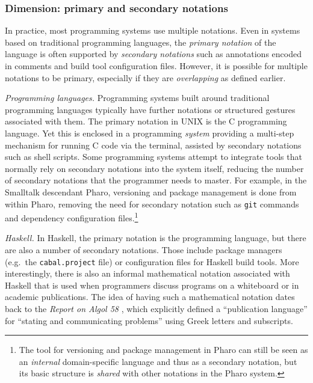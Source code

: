 \documentclass[english,submission]{programming}
\begin{document}
\hypertarget{dimension-primary-and-secondary-notations}{%
\subsubsection{Dimension: primary and secondary
notations}\label{dimension-primary-and-secondary-notations}}

In practice, most programming systems use multiple notations. Even in
systems based on traditional programming languages, the \emph{primary
notation} of the language is often supported by \emph{secondary
notations} such as annotations encoded in comments and build tool
configuration files. However, it is possible for multiple notations to
be primary, especially if they are \emph{overlapping} as defined
earlier.

\emph{Programming languages.} Programming systems built around
traditional programming languages typically have further notations or
structured gestures associated with them. The primary notation in UNIX
is the C programming language. Yet this is enclosed in a programming
\emph{system} providing a multi-step mechanism for running C code via
the terminal, assisted by secondary notations such as shell scripts.
Some programming systems attempt to integrate tools that normally rely
on secondary notations into the system itself, reducing the number of
secondary notations that the programmer needs to master. For example, in
the Smalltalk descendant Pharo, versioning and package management is
done from within Pharo, removing the need for secondary notation such as
\texttt{git} commands and dependency configuration files.\footnote{The
  tool for versioning and package management in Pharo can still be seen
  as an \emph{internal} domain-specific language and thus as a secondary
  notation, but its basic structure is \emph{shared} with other
  notations in the Pharo system.}

\emph{Haskell.} In Haskell, the primary notation is the programming
language, but there are also a number of secondary notations. Those
include package managers (e.g.~the \texttt{cabal.project} file) or
configuration files for Haskell build tools. More interestingly, there
is also an informal mathematical notation associated with Haskell that
is used when programmers discuss programs on a whiteboard or in academic
publications. The idea of having such a mathematical notation dates back
to the \emph{Report on Algol 58} \cite{Alg58}, which explicitly defined
a ``publication language'' for ``stating and communicating problems''
using Greek letters and subscripts.
\end{document}
